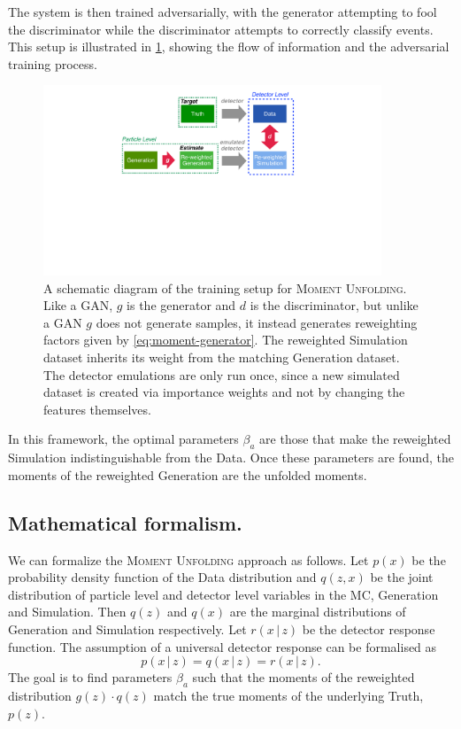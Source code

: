        The system is then trained adversarially, with the generator attempting to fool the discriminator while the discriminator attempts to correctly classify events.
        This setup is illustrated in \cref{fig:schematic}, showing the flow of information and the adversarial training process.
        \begin{figure}
    \centering
    \includegraphics[width=0.90\textwidth]{figures/chapter-05/Schematic_momentunfolding.pdf}
    \caption{A schematic diagram of the training setup for \textsc{Moment Unfolding}.  Like a GAN, $g$ is the generator and $d$ is the discriminator, but unlike a GAN $g$ does not generate samples, it instead generates reweighting factors given by \cref{eq:moment-generator}.  The reweighted Simulation dataset inherits its weight from the matching Generation dataset.  The detector emulations are only run once, since a new simulated dataset is created via importance weights and not by changing the features themselves.}
    \label{fig:schematic}
\end{figure}
        In this framework, the optimal parameters $\beta_a$ are those that make the reweighted Simulation indistinguishable from the Data.
        Once these parameters are found, the moments of the reweighted Generation are the unfolded moments.
    
    \subsection{Mathematical formalism.}
    
        We can formalize the \textsc{Moment Unfolding} approach as follows.
        Let $p(x)$ be the probability density function of the Data distribution and $q(z,x)$ be the joint distribution of particle level and detector level variables in the MC, Generation and Simulation.
        Then $q(z)$ and $q(x)$ are the marginal distributions of Generation and Simulation respectively.
        Let $r(x\,|\,z)$ be the detector response function.
        The assumption of a universal detector response can be formalised as
        \[
            p(x\,|\,z) = q(x\,|\,z) = r(x\,|\,z).
        \]
        The goal is to find parameters $\beta_a$ such that the moments of the reweighted distribution $g(z) \cdot q(z)$ match the true moments of the underlying Truth, \(p(z)\).

